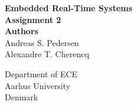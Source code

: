 \documentclass[../main.tex]{subfiles}
\begin{document}
\thispagestyle{empty}

\begin{titlepage}
    \begin{center}
        \vspace*{20pt}
        \textbf{\Huge{Embedded Real-Time Systems}} \\
        \vspace*{20pt}
        \textbf{\large{Assignment 2}} \\
        \vspace*{50pt}
        \textbf{\Large{Authors}} \\
        Andreas S. Pedersen     \\
        Alexandre T. Cherencq   \\
        \vfill

        \vspace{0.8cm}

        \vspace*{1cm}

        Department of ECE\\
        Aarhus University\\
        Denmark
    \end{center}
\end{titlepage}
\end{document}

